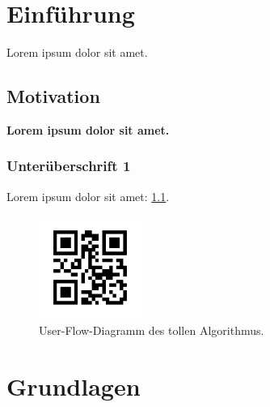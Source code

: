 \documentclass[12pt,twoside=false,a4paper,parskip]{scrbook}
\begin{document}
\renewcommand{\contentsname}{Table of Contents}
\tableofcontents


\listoffigures
{}


\listoftables
{}



\mainmatter

\chapter{Einführung}\label{ch:intro}

Lorem ipsum dolor sit amet.

\section{Motivation}\label{sec:einfuehrung_motivation}

\textbf{Lorem ipsum dolor sit amet.}

\subsection{Unterüberschrift 1}\label{subsec:einfuehrung_motivation_unterueberschrift}

Lorem ipsum dolor sit amet: \ref{fig:user-flow-diagramm}.

\begin{figure}[H]
  \centering
  \includegraphics[width=0.3\textwidth]{barcode_default.png}
  \caption{User-Flow-Diagramm des tollen Algorithmus.}
  \label{fig:user-flow-diagramm}
\end{figure}

\chapter{Grundlagen}
\end{document}
